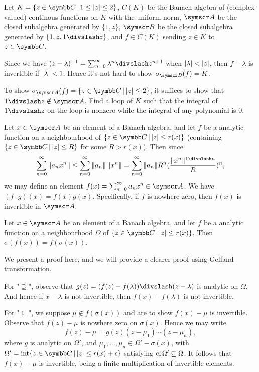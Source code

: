 \begin{example}
  Let $K = \{z\in\CC\VERT 1\leq\ABS{z}\leq 2\}$, $C(K)$ be the Banach algebra of (complex valued) continous functions on $K$ with the uniform norm, $\BA A$ be the closed subalgebra generated by $\{1, z\}$, $\BA B$ be the closed subalgebra generated by $\{1, z, 1\DIV z\}$, and $f\in C(K)$ sending $z\in K$ to $z\in\CC$.

  Since we have $(z-\lambda)^{-1}=\sum_{n=0}^\infty \lambda^n\DIV z^{n+1}$ when $\vert\lambda\vert<\vert z\vert$, then $f-\lambda$ is invertible if $\vert\lambda\vert < 1$. Hence it's not hard to show $\sigma_{\BA B}(f)=K$.

  To show $\sigma_{\BA A}(f)=\{z\in\CC\VERT \ABS{z}\leq 2\}$, it suffices to show that $1\DIV z\notin \BA A$. Find a loop of $K$ such that the integral of $1\DIV z$ on the loop is nonzero while the integral of any polynomial is 0.
\end{example}

Let $x\in \BA A$ be an element of a Banach algebra, and let $f$ be a analytic function on a neighbourhood of $\{z\in\CC\VERT \ABS{z}\leq r(x)\}$ (containing $\{z\in\CC\VERT \ABS{z}\leq R\}$ for some $R>r(x)$). Then since
\begin{equation*}
  \sum_{n=0}^\infty \NORM{a_nx^n}\leq\sum_{n=0}^\infty\NORM{a_n}\,\NORM{x^n}=\sum_{n=0}^\infty \NORM{a_n}R^n(\frac{\NORM{x^n}^{1\DIV n}}{R})^n,
\end{equation*}
we may define an element $f(x)=\sum_{n=0}^\infty a_nx^n\in \BA A$. We have $(f\cdot g)(x)=f(x)g(x)$. Specifically, if $f$ is nowhere zero, then $f(x)$ is invertible in $\BA A$.

\begin{theorem}
  Let $x\in \BA A$ be an element of a Banach algebra, and let $f$ be a analytic function on a neighbourhood $\Omega$ of $\{z\in\CC\VERT \ABS{z}\leq r(x)\}$. Then $\sigma(f(x))=f(\sigma(x))$.
\end{theorem}

We present a proof here, and we will provide a clearer proof using Gelfand transformation.

\begin{hint}
  For "$\supseteq$", observe that $g(z)=(f(z)-f(\lambda))\DIV (z-\lambda)$ is analytic on $\Omega$. And hence if $x-\lambda$ is not invertible, then $f(x)-f(\lambda)$ is not invertible.

  For "$\subseteq$", we suppose $\mu\notin f(\sigma(x))$ and are to show $f(x)-\mu$ is invertible. Observe that $f(z)-\mu$ is nowhere zero on $\sigma(x)$. Hence we may write
  \begin{equation*}
    f(z)-\mu=g(z)(z-\mu_1)\dotsb(z-\mu_n),
  \end{equation*}
  where $g$ is analytic on $\Omega'$, and $\mu_1, \dotsc, \mu_n\in\Omega'-\sigma(x)$, with $\Omega'=\INT \{z\in\CC\VERT \ABS{z}\leq r(x)+\epsilon\}$ satisfying $\operatorname{cl}\Omega'\subseteq\Omega$. It follows that $f(x)-\mu$ is invertible, being a finite multiplication of invertible elements.
\end{hint}

